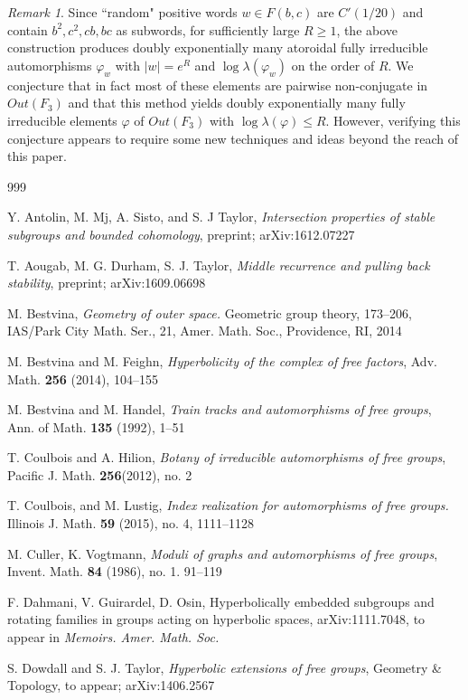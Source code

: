 \documentclass[11pt,letterpaper]{amsart}
\theoremstyle{definition}
\theoremstyle{remark}
\newtheorem{rem}[thm]{Remark}
\renewcommand{\phi}{\varphi}
\begin{document}
\begin{rem}
Since ``random" positive words $w\in F(b,c)$ are $C'(1/20)$ and contain $b^2,c^2,cb,bc$ as subwords, for sufficiently large $R\ge 1$, the above construction produces doubly exponentially many atoroidal fully irreducible automorphisms $\phi_w$ with $|w|=e^R$ and $\log\lambda(\phi_w)$ on the order of $R$.  We conjecture that in fact most of these elements are pairwise non-conjugate in $Out(F_3)$ and that this method yields doubly exponentially many fully irreducible elements $\phi$ of $Out(F_3)$ with $\log\lambda(\phi)\le R$. However, verifying this conjecture appears to require some new techniques and ideas beyond the reach of this paper. 
\end{rem}


\begin{thebibliography}{999}

Y. Antolin, M. Mj, A. Sisto, and S. J Taylor,
\emph{Intersection properties of stable subgroups and bounded cohomology}, preprint; arXiv:1612.07227

T. Aougab, M. G. Durham, S. J. Taylor, \emph{Middle recurrence and pulling back stability}, preprint; arXiv:1609.06698


M. Bestvina, \emph{Geometry of outer space.} Geometric group theory, 173--206, IAS/Park City Math. Ser., 21, Amer. Math. Soc., Providence, RI, 2014

M. Bestvina and M. Feighn, \emph{Hyperbolicity of the complex of free factors}, Adv. Math. \textbf{256} (2014), 104--155

M. Bestvina and M. Handel, \emph{Train tracks and automorphisms of free groups}, Ann. of Math.  \textbf{135} (1992), 1--51

T. Coulbois and A. Hilion, \emph{Botany of irreducible automorphisms of free groups}, Pacific J. Math. \textbf{256}(2012), no. 2

T. Coulbois, and M. Lustig, \emph{Index realization for automorphisms of free groups.} Illinois J. Math. \textbf{59} (2015), no. 4, 1111--1128

M. Culler, K. Vogtmann, \emph{Moduli of graphs and automorphisms of free groups}, Invent. Math. \textbf{84} (1986), no. 1. 91--119

F. Dahmani, V. Guirardel, D. Osin, Hyperbolically embedded subgroups and rotating families in groups acting on hyperbolic spaces,  arXiv:1111.7048, to appear in \emph{Memoirs. Amer. Math. Soc.}

S. Dowdall and S. J. Taylor, \emph{Hyperbolic extensions of free groups}, Geometry \& Topology, to appear; arXiv:1406.2567


\end{thebibliography}
\end{document}
